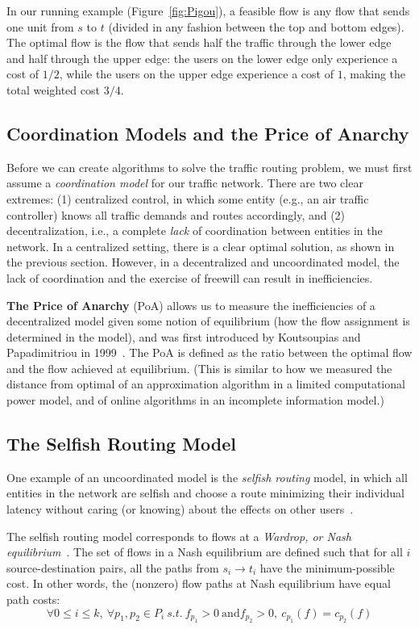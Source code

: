 In our running example (Figure~\ref{fig:Pigou}), a feasible flow is any flow that sends one unit from $s$ to $t$ (divided in any fashion between the top and bottom edges).
The optimal flow is the flow that sends half the traffic through the lower edge and half through the upper edge: the users on the lower edge only experience a cost of $1/2$, while the users on the upper edge experience a cost of $1$, making the total weighted cost $3/4$.

\subsection{Coordination Models and the Price of Anarchy}
Before we can create algorithms to solve the traffic routing problem, we must first assume a \emph{coordination model} for our traffic network.
There are two clear extremes: (1) centralized control, in which some entity (e.g., an air traffic controller) knows all traffic demands and routes accordingly, and
(2) decentralization, i.e., a complete \emph{lack} of coordination between
entities in the network.
In a centralized setting, there is a clear optimal solution, as shown in the previous section.
However, in a decentralized and uncoordinated model, the lack of coordination and the exercise of freewill can result in
inefficiencies. 

\medskip
\textbf{The Price of Anarchy} (PoA) allows us to measure the inefficiencies of a decentralized model given some notion of equilibrium (how the flow assignment is determined in the model), and was first introduced by Koutsoupias and Papadimitriou in 1999~\cite{poa}. 
The PoA is defined as the ratio between the optimal flow and the flow achieved
at equilibrium.
(This is similar to how we measured the distance from optimal of an approximation algorithm in a limited computational power model, and of online algorithms in an incomplete information model.)

\subsection{The Selfish Routing Model}
One example of an uncoordinated model is the \emph{selfish routing} model, in which all entities in the network are selfish and choose a route minimizing their individual latency without caring (or knowing) about the effects on other users~\cite{tardos}.

The selfish routing model corresponds to flows at a \emph{Wardrop, or Nash equilibrium}~\cite{wardrop,haurie}.
The set of flows in a Nash equilibrium are defined such that for all $i$ source-destination pairs, all the paths from $s_i \to t_i$ have the minimum-possible cost. In other words, the (nonzero) 
flow paths at Nash equilibrium have equal path costs: 
$$\forall 0\le i \le k,~\forall p_1, p_2\in P_i~s.t.~f_{p_1} > 0~\text{and} f_{p_2} > 0,~ c_{p_1}(f) = c_{p_2}(f)$$


